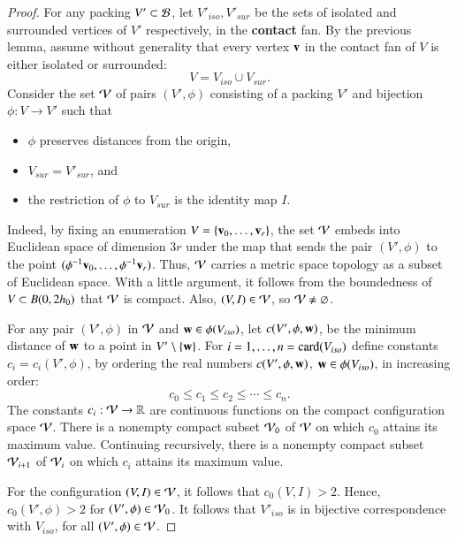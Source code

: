\begin{proof}  For any packing $V'\subset {\mathcal B}$, let $V'_{iso},V'_{sur}$ be the
sets of isolated and surrounded vertices of $V'$ respectively, in the {\bf contact}
fan.  
By the previous lemma,  assume
without generality that every vertex ${\mathbf v}$ in the contact fan of $V$ is either isolated
or surrounded:
$$
V = V_{iso} \cup V_{sur}.
$$
Consider the set ${\mathcal V}$ of pairs $(V',\phi)$ consisting of a packing $V'$
and bijection $\phi:V\to V'$ such that
\begin{itemize}
\item $\phi$ preserves distances from the origin, 
\item $V_{sur}=V'_{sur}$, and 
\item the restriction of $\phi$ to $V_{sur}$ is the identity map $I$.
\end{itemize}
%

  Indeed, by fixing an enumeration
$V = \{{\mathbf v}_0,\ldots,{\mathbf v}_r\}$,  
the set ${\mathcal V}$ embeds into Euclidean space of dimension $3r$ under the map that sends
the pair $(V',\phi)$ to 
the point $(\phi^{-1}{\mathbf v}_0,\ldots,\phi^{-1}{\mathbf v}_r)$.
Thus, ${\mathcal V}$ carries a metric space topology as a subset of Euclidean space.  With a little
argument, it follows from the boundedness of $V\subset B(0,2{h_0})$ that ${\mathcal V}$ is compact.
Also, $(V,I)\in {\mathcal V}$, so ${\mathcal V}\ne\varnothing$.


For any pair $(V',\phi)$ in ${\mathcal V}$ and ${\mathbf w}\in \phi(V_{iso})$, let
$c(V',\phi,{\mathbf w})$, 
be the minimum distance of ${\mathbf w}$ to a point
in $V'\setminus \{{\mathbf w}\}$.   
For $i=1,\ldots,n={\operatorname{card}}(V_{iso})$
define constants $c_i=c_i(V',\phi)$,
by ordering the real numbers $c(V',\phi,{\mathbf w})$, ${\mathbf w}\in\phi(V_{iso})$, in increasing order:
$$
c_0 \le c_1 \le c_2 \le \cdots \le c_n.
$$
The constants $c_i:{\mathcal V}\to\mathbb{R}$ are continuous functions on the compact configuration space ${\mathcal V}$.
There is a nonempty 
compact subset ${\mathcal V}_0$ of ${\mathcal V}$ on which
$c_0$ attains its maximum value. Continuing recursively,
there is a nonempty compact subset ${\mathcal V}_{i+1}$ of
${\mathcal V}_{i}$ on which $c_i$ attains its maximum value.
%
%

For the configuration $(V,I)\in {\mathcal V}$, it follows that $c_0(V,I) >2$.
Hence, $c_0(V',\phi)>2$ for $(V',\phi)\in{\mathcal V}_0$.  It follows
that $V'_{iso}$ is in bijective correspondence with
$V_{iso}$, for all $(V',\phi)\in {\mathcal V}$.


\end{proof}
